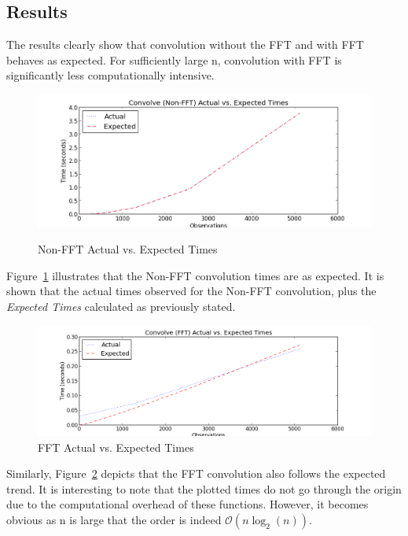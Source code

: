 
\subsection{Results} %
\label{sub:Results}

The results clearly show that convolution without the FFT and with FFT behaves as expected. For sufficiently large n, convolution with FFT is significantly less computationally intensive. 

\begin{figure}[H]
    \centering
        \includegraphics[width=6.5in]{./include/convolve_nonfft.png}
    \label{fig:convolve_nonfft}
    \caption{Non-FFT Actual vs. Expected Times}
\end{figure}\noindent
Figure~\ref{fig:convolve_nonfft} illustrates that the Non-FFT convolution times are as expected. It is shown that the actual times observed for the Non-FFT convolution, plus the \emph{Expected Times} calculated as previously stated. 

\begin{figure}[H]
    \centering
        \includegraphics[width=6.5in]{./include/convolve_fft.png}
        \caption{FFT Actual vs. Expected Times}
        \label{fig:convolve_fft}
\end{figure}\noindent
Similarly, Figure~\ref{fig:convolve_fft} depicts that the FFT convolution also follows the expected trend. It is interesting to note that the plotted times do not go through the origin due to the computational overhead of these functions. However, it becomes obvious as n is large that the order is indeed $\mathcal{O}(n \log_2(n))$.

